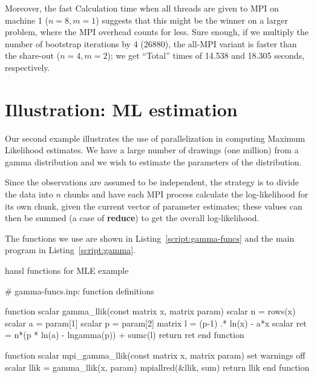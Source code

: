 \documentclass{article}
\begin{document}
Moreover, the fast Calculation time when all threads are given to MPI
on machine 1 ($n=8,m=1$) suggests that this might be the winner on a
larger problem, where the MPI overhead counts for less. Sure enough,
if we multiply the number of bootstrap iterations by 4 (26880), the
all-MPI variant is faster than the share-out ($n=4, m=2$); we get
``Total'' times of 14.538 and 18.305 seconds, respectively.

\section{Illustration: ML estimation}
\label{sec:gamma}

Our second example illustrates the use of parallelization in computing
Maximum Likelihood estimates. We have a large number of drawings (one
million) from a gamma distribution and we wish to estimate the
parameters of the distribution.

Since the observations are assumed to be independent, the strategy is
to divide the data into $n$ chunks and have each MPI process calculate
the log-likelihood for its own chunk, given the current vector of
parameter estimates; these values can then be summed (a case of
\textbf{reduce}) to get the overall log-likelihood.

The functions we use are shown in Listing~\ref{script:gamma-funcs} and
the main program in Listing~\ref{script:gamma}.

\begin{script}[htbp]
  \caption{hansl functions for MLE example}
  \label{script:gamma-funcs}
\begin{scode}
# gamma-funcs.inp: function definitions

function scalar gamma_llik(const matrix x, matrix param)
  scalar n = rows(x)
  scalar a = param[1]
  scalar p = param[2]
  matrix l =  (p-1) .* ln(x) - a*x
  scalar ret = n*(p * ln(a) - lngamma(p)) + sumc(l)
  return ret
end function

function scalar mpi_gamma_llik(const matrix x, matrix param)
  set warnings off
  scalar llik = gamma_llik(x, param)
  mpiallred(&llik, sum)
  return llik
end function
\end{scode}
\end{script}
\end{document}
